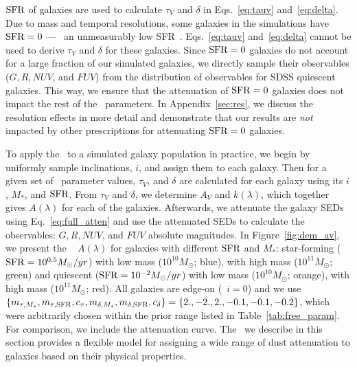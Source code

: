 
${\rm SFR}$ of galaxies are used to calculate $\tau_V$ and $\delta$ in
Eqs.~\ref{eq:tauv} and~\ref{eq:delta}. Due to mass and temporal resolutions,
some galaxies in the simulations have ${\rm SFR}=0$ --- \ie~an unmeasurably low
SFR~\citep{hahn2019c}. Eqs.~\ref{eq:tauv} and~\ref{eq:delta} cannot be used to
derive $\tau_V$ and $\delta$ for these galaxies. Since ${\rm SFR}=0$ galaxies do
not account for a large fraction of our simulated galaxies, we directly sample 
their observables ($G, R, NUV$, and $FUV$) from the distribution of observables
for SDSS quiescent galaxies. This way, we ensure that the attenuation of ${\rm SFR}=0$ 
galaxies does not impact the rest of the \eda~parameters. In Appendix~\ref{sec:res}, 
we discuss the resolution effects in more detail and demonstrate that our results
are \emph{not} impacted by other prescriptions for attenuating ${\rm SFR}=0$ galaxies.

To apply the \eda~to a simulated galaxy population in practice, we begin by
uniformly sample inclinations, $i$, and assign them to each galaxy. Then for a
given set of \eda~parameter values, $\tau_V$, and $\delta$ are calculated for
each galaxy using its $i$, $M_*$, and ${\rm SFR}$. From $\tau_V$ and $\delta$, we
determine $A_V$ and $k(\lambda)$, which together gives $A(\lambda)$ for each of
the galaxies.  Afterwards, we attenuate the galaxy SEDs using Eq.~\ref{eq:full_atten} and use 
the attenuated SEDs to calculate the observables: $G, R, NUV$, and $FUV$
absolute magnitudes. In Figure~\ref{fig:dem_av}, we present the \eda~ 
$A(\lambda)$
for galaxies with different ${\rm SFR}$ and $M_*$: 
star-forming (${\rm SFR}=10^{0.5}M_\odot/yr$) with low mass ($10^{10}M_\odot$;
blue), with high mass ($10^{11}M_\odot$; green) and quiescent
(${\rm SFR}=10^{-2}M_\odot/yr$) with low mass ($10^{10}M_\odot$; orange), with high
mass ($10^{11}M_\odot$; red). All galaxies are edge-on (\ie~$i=0$) and we use
$\{m_{\tau,M_*}, m_{\tau,{\rm SFR}}, c_\tau, m_{\delta,M_*}, m_{\delta,{\rm SFR}},
c_\delta\} = \{2., -2., 2., -0.1, -0.1, -0.2\}$, which were arbitrarily chosen
within the prior range listed in Table~\ref{tab:free_param}. For comparison, we 
include the \cite{calzetti2001} attenuation curve. The \eda~we describe in this 
section provides a flexible model for assigning a wide range of dust attenuation 
to galaxies based on their physical properties. 


